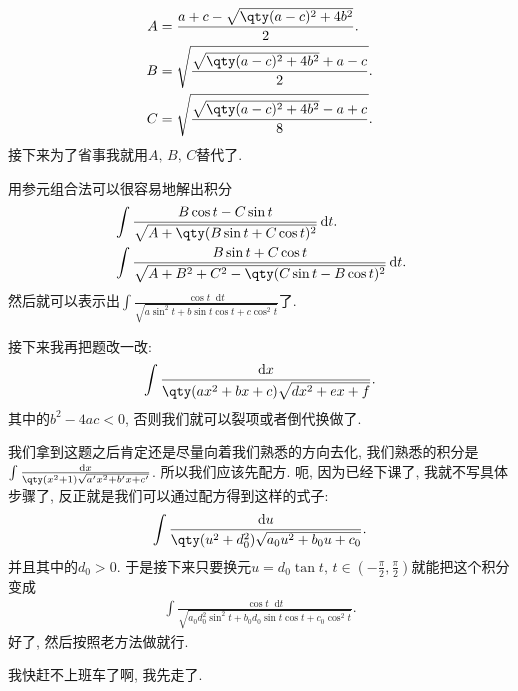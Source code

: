 \documentclass{ctexbook}
\newcommand*{\dif}{\mathop{}\!\mathrm{d}}
\begin{document}
{\begin{align*}
A={}&\frac{a+c-\sqrt{\qty(a-c)^{2}+4b^{2}}}{2}.\\
B={}&\sqrt{\frac{\sqrt{\qty(a-c)^{2}+4b^{2}}+a-c}{2}}.\\
C={}&\sqrt{\frac{\sqrt{\qty(a-c)^{2}+4b^{2}}-a+c}{8}}
.\end{align*}
接下来为了省事我就用$A,\,B,\,C$替代了. \par
用参元组合法可以很容易地解出积分
\begin{align*}
{}&\int\frac{B\cos{t}-C\sin{t}}{\sqrt{A+\qty(B\sin{t}+C\cos{t})^{2}}}\dif{t}.\\
{}&\int\frac{B\sin{t}+C\cos{t}}{\sqrt{A+B^{2}+C^{2}-\qty(C\sin{t}-B\cos{t})^{2}}}\dif{t}
.\end{align*}
然后就可以表示出$\int\frac{\cos{t}\dif{t}}{\sqrt{a\sin^{2}{t}+b\sin{t}\cos{t}+c\cos^{2}{t}}}$了. \par
接下来我再把题改一改: 
\begin{align*}
\int\frac{\dif{x}}{\qty(ax^{2}+bx+c)\sqrt{dx^{2}+ex+f}}
.\end{align*}
其中的$b^{2}-4ac<0$, 否则我们就可以裂项或者倒代换做了. \par
我们拿到这题之后肯定还是尽量向着我们熟悉的方向去化, 我们熟悉的积分是\\$\int\frac{\dif{x}}{\qty(x^{2}+1)\sqrt{a'x^{2}+b'x+c'}}$. 所以我们应该先配方. 呃, 因为已经下课了, 我就不写具体步骤了, 反正就是我们可以通过配方得到这样的式子: 
\begin{align*}
\int\frac{\dif{u}}{\qty(u^{2}+d_{0}^{2})\sqrt{a_{0}u^{2}+b_{0}u+c_{0}}}
.\end{align*}
并且其中的$d_{0}>0$. 于是接下来只要换元$u=d_{0}\tan{t},\,t\in\left(-\frac{\pi}{2},\frac{\pi}{2}\right)$就能把这个积分变成
\begin{align*}
\int\frac{\cos{t}\dif{t}}{\sqrt{a_{0}d_{0}^{2}\sin^{2}{t}+b_{0}d_{0}\sin{t}\cos{t}+c_{0}\cos^{2}{t}}}
.\end{align*}
好了, 然后按照老方法做就行. \par
我快赶不上班车了啊, 我先走了. \par
}
\end{document}
